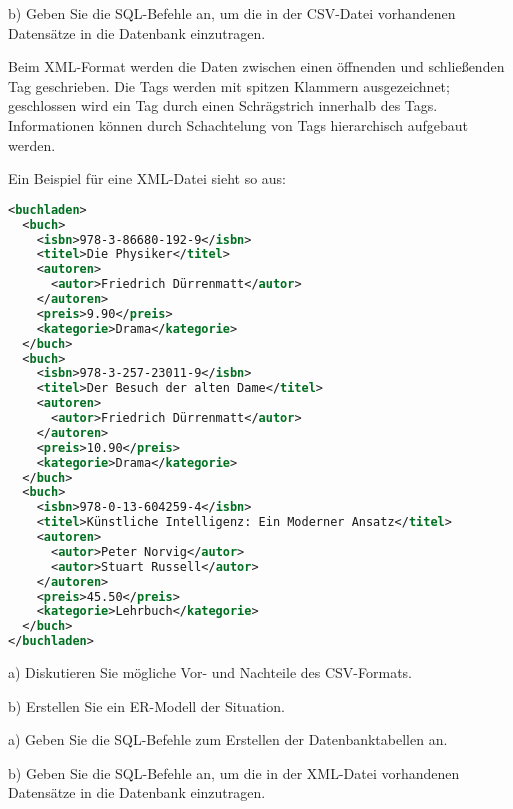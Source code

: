 \documentclass[11pt, a4paper, oneside]{article}
\begin{document}
	\lines[4cm]
	
	b) Geben Sie die SQL-Befehle an, um die in der CSV-Datei vorhandenen Datensätze in die Datenbank einzutragen.
	
	\lines[4cm]
	
	\pagebreak
	
	
	Beim XML-Format werden die Daten zwischen einen öffnenden und schließenden Tag geschrieben.
	Die Tags werden mit spitzen Klammern ausgezeichnet; geschlossen wird ein Tag durch einen Schrägstrich innerhalb des Tags.
	Informationen können durch Schachtelung von Tags hierarchisch aufgebaut werden.
	
	Ein Beispiel für eine XML-Datei sieht so aus:
	
	\begin{lstlisting}[language=XML]
<buchladen>
  <buch>
  	<isbn>978-3-86680-192-9</isbn>
    <titel>Die Physiker</titel>
    <autoren>
      <autor>Friedrich Dürrenmatt</autor>
    </autoren>
    <preis>9.90</preis>
    <kategorie>Drama</kategorie>
  </buch>
  <buch>
  	<isbn>978-3-257-23011-9</isbn>
    <titel>Der Besuch der alten Dame</titel>
    <autoren>
      <autor>Friedrich Dürrenmatt</autor>
   	</autoren>
    <preis>10.90</preis>
    <kategorie>Drama</kategorie>
  </buch>
  <buch>
    <isbn>978-0-13-604259-4</isbn>
    <titel>Künstliche Intelligenz: Ein Moderner Ansatz</titel>
    <autoren>
      <autor>Peter Norvig</autor>
      <autor>Stuart Russell</autor>
    </autoren>
    <preis>45.50</preis>
    <kategorie>Lehrbuch</kategorie>
  </buch>
</buchladen>
	\end{lstlisting}
	
	\pagebreak
	
	a) Diskutieren Sie mögliche Vor- und Nachteile des CSV-Formats.
	
	\lines[5cm]
	
	b) Erstellen Sie ein ER-Modell der Situation.
	
	\boxarea[7cm]
	
	
	a) Geben Sie die SQL-Befehle zum Erstellen der Datenbanktabellen an.
	
	\lines[5cm]
	
	b) Geben Sie die SQL-Befehle an, um die in der XML-Datei vorhandenen Datensätze in die Datenbank einzutragen.
	
	\lines[4cm]
	
	
\end{document}
